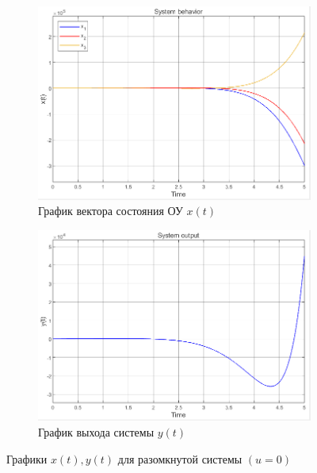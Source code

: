 \documentclass[a4paper, 12pt]{article}
\begin{document}
    \begin{figure}[H]
        \centering
        \begin{subfigure}{0.45\textwidth}
            \centering
            \includegraphics[width=\linewidth]{1task_x.png}
            \caption{График вектора состояния ОУ $x(t)$}
            \label{fig:1task_x}
        \end{subfigure}
        \hspace{5mm}
        \begin{subfigure}{0.45\textwidth}
            \centering
            \includegraphics[width=\linewidth]{1task_y.png}
            \caption{График выхода системы $y(t)$}
            \label{fig:1task_y}
        \end{subfigure}
        \caption{Графики $x(t),y(t)$ для разомкнутой системы $\left( u=0 \right)$}
        \label{fig:1task_xy}
    \end{figure}
\end{document}
